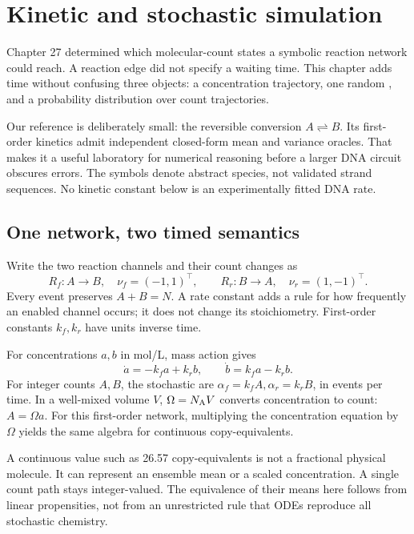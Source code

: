 \chapter{Kinetic and stochastic simulation}
Chapter 27 determined which molecular-count states a symbolic reaction network
could reach. A reaction edge did not specify a waiting time. This chapter adds
time without confusing three objects: a concentration trajectory, one random
, and a probability distribution over count trajectories.

Our reference is deliberately small: the reversible conversion $A\rightleftharpoons B$.
Its first-order kinetics admit independent closed-form mean and variance oracles.
That makes it a useful laboratory for numerical reasoning before a larger DNA
circuit obscures errors. The symbols denote abstract species, not validated strand
sequences. No kinetic constant below is an experimentally fitted DNA rate.

\section{One network, two timed semantics}
Write the two reaction channels and their count changes as
\[
R_f:A\longrightarrow B,\quad \nu_f=(-1,1)^\top,\qquad
R_r:B\longrightarrow A,\quad \nu_r=(1,-1)^\top.
\]
Every event preserves $A+B=N$. A rate constant adds a rule for how frequently an
enabled channel occurs; it does not change its stoichiometry. First-order constants
$k_f,k_r$ have units inverse time.

For concentrations $a,b$ in mol/L, mass action gives
\[
\dot a=-k_fa+k_rb,\qquad \dot b=k_fa-k_rb.
\]
For integer counts $A,B$, the stochastic  are
$\alpha_f=k_f A,\alpha_r=k_r B$, in events per time. In a well-mixed volume $V$,
$\Omega=N_{\rm A}V$ converts concentration to count: $A=\Omega a$. For this
first-order network, multiplying the concentration equation by $\Omega$ yields
the same algebra for continuous copy-equivalents.

A continuous value such as 26.57 copy-equivalents is not a fractional physical
molecule. It can represent an ensemble mean or a scaled concentration. A single
count path stays integer-valued. The equivalence of their means here follows from
linear propensities, not from an unrestricted rule that ODEs reproduce all
stochastic chemistry.

